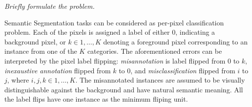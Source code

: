 %
%
%
%

\noindent
\textit{Briefly formulate the problem.}

\noindent
Semantic Segmentation tasks can be considered as per-pixel classification problem. Each of the pixels is assigned a label of either $0$, indicating a background pixel, or $k \in {1, \ldots, K}$ denoting a foreground pixel corresponding to an instance from one of the $K$ categories.
The aforementioned errors can be interpreted by the pixel label flipping:
\textit{misannotation} is label flipped from $0$ to $k$, \textit{inexaustive annotation} flipped from $k$ to $0$, and \textit{misclassification} flipped from $i$ to $j$, where $i, j, k \in {1, \ldots, K}$.
The misannotated instances are assumed to be visually distinguishable against the background and have natural semantic meaning. All the label flips have one instance as the minimum fliping unit.

